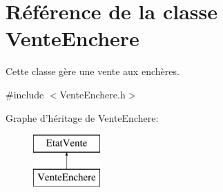 \hypertarget{class_vente_enchere}{\section{Référence de la classe Vente\-Enchere}
\label{class_vente_enchere}
}


Cette classe gère une vente aux enchères.  




{\ttfamily \#include $<$Vente\-Enchere.\-h$>$}

Graphe d'héritage de Vente\-Enchere\-:\begin{figure}[H]
\begin{center}
\leavevmode
\includegraphics[height=2.000000cm]{class_vente_enchere}
\end{center}
\end{figure}
